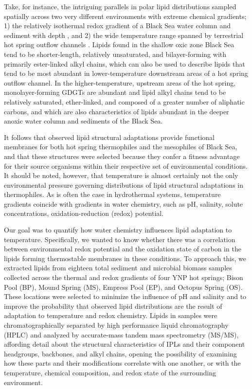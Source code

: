 Take, for instance, the intriguing parallels in polar lipid distributions sampled spatially across two very different environments with extreme chemical gradients; 1) the relatively isothermal redox gradient of a Black Sea water column and sediment with depth \citep{schubotz2009detection, schroder2015intact}, and 2) the wide temperature range spanned by terrestrial hot spring outflow channels \citep{schubotz2013spatial, schubotz2015stable}. Lipids found in the shallow oxic zone Black Sea tend to be shorter-length, relatively unsaturated, and bilayer-forming with primarily ester-linked alkyl chains, which can also be used to describe lipids that tend to be most abundant in lower-temperature downstream areas of a hot spring outflow channel. In the higher-temperature, upstream areas of the hot spring, monolayer-forming GDGTs are abundant and lipid alkyl chains tend to be relatively saturated, ether-linked, and composed of a greater number of aliphatic carbons, and which are also characteristics of lipids abundant in the deeper anoxic water column and sediments of the Black Sea. 

It follows that observed lipid structural adaptations provide functional membranes for both hot spring thermophiles and the mesophiles of Black Sea, and that these structures were selected because they confer a fitness advantage for their source organisms within their respective set of environmental conditions. It should be noted, however, that temperature is almost certainly not the only environmental pressure governing distributions of lipid structural adaptations in thermophiles. As is often the case in hydrothermal systems, temperature gradients coincide with gradients in water chemistry, such as pH, salinity, solute concentrations, oxidation-reduction (redox) potential.

Our goal was to quantify how water chemistry influences lipid adaptation to temperature. Specifically, we wanted to know whether there was a correlation between environmental redox potential and the oxidation state of carbon in the lipids forming thermostable membranes in these conditions. To approach this, we extracted lipids from eighteen total sediment and microbial biomass samples collected across the thermal and redox gradients of four YNP hot springs; Bison Pool (BP), Mound Spring (MS), Empress Pool (EP), and Octopus Spring (OS). These locations were selected to minimize the influence of pH and salinity and to improve the probability that observed lipid distributions are the result of adaptation to temperature and redox chemistry. Lipids in samples were chromatographically separated by high performance liquid chromatography (HPLC) and analyzed by accurate-mass tandem mass spectrometry (MS/MS), affording detail about the structural characteristics of IPLs and their component headgroups, backbones, and alkyl chains, opening the possibility of examining how these parts and their modifications correlate with one another, or with the temperature, chemical composition, and redox state of the surrounding environment.

